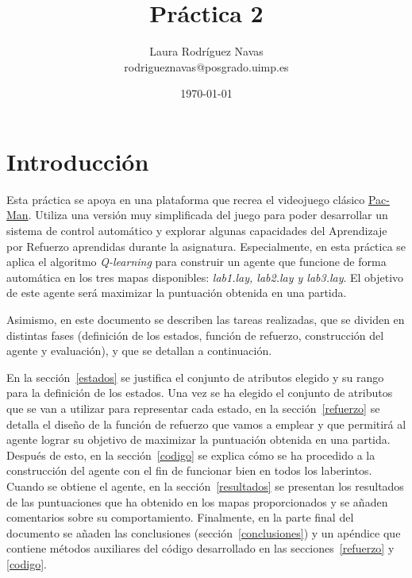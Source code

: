 \documentclass[11pt]{exam}
\title{Práctica 2}
\author{Laura Rodríguez Navas \\ rodrigueznavas@posgrado.uimp.es}
\date{{\selectlanguage{spanish}\today} }
\begin{document}
	
\maketitle

\section{Introducción}\label{introduccion}

{\setlength{\parindent}{0cm}
Esta práctica se apoya en una plataforma que recrea el videojuego clásico \href{1https://en.wikipedia.org/wiki/Pac-Man}{Pac-Man}. Utiliza una versión muy simplificada del juego para poder desarrollar un sistema de control automático y explorar algunas capacidades del Aprendizaje por Refuerzo aprendidas durante la asignatura. Especialmente, en esta práctica se aplica el algoritmo \textit{Q-learning} para construir un agente que funcione de forma automática en los tres mapas disponibles: \textit{lab1.lay, lab2.lay y lab3.lay}. El objetivo de este agente será maximizar la puntuación obtenida en una partida.
}

Asimismo, en este documento se describen las tareas realizadas, que se dividen en distintas fases (definición de los estados, función de refuerzo, construcción del agente y evaluación), y que se detallan a continuación.

En la sección~\ref{estados} se justifica el conjunto de atributos elegido y su rango para la definición de los estados. Una vez se ha elegido el conjunto de atributos que se van a utilizar para representar cada estado, en la sección~\ref{refuerzo} se detalla el diseño de la función de refuerzo que vamos a emplear y que permitirá al agente lograr su objetivo de maximizar la puntuación obtenida en una partida. Después de esto, en la sección~\ref{codigo} se explica cómo se ha procedido a la construcción del agente con el fin de funcionar bien en todos los laberintos. Cuando se obtiene el agente, en la sección~\ref{resultados} se presentan los resultados de las puntuaciones que ha obtenido en los mapas proporcionados y se añaden comentarios sobre su comportamiento. Finalmente, en la parte final del documento se añaden las conclusiones (sección~\ref{conclusiones}) y un apéndice que contiene métodos auxiliares del código desarrollado en las secciones~\ref{refuerzo} y \ref{codigo}.

\end{document}
